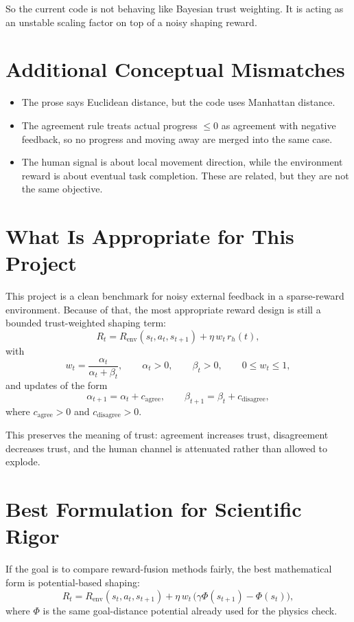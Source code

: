 \documentclass[11pt]{article}
\begin{document}
So the current code is not behaving like Bayesian trust weighting. It is acting as an unstable scaling factor on top of a noisy shaping reward.

\section*{Additional Conceptual Mismatches}

\begin{itemize}
\item The prose says Euclidean distance, but the code uses Manhattan distance.
\item The agreement rule treats actual progress $\leq 0$ as agreement with negative feedback, so no progress and moving away are merged into the same case.
\item The human signal is about local movement direction, while the environment reward is about eventual task completion. These are related, but they are not the same objective.
\end{itemize}

\section*{What Is Appropriate for This Project}

This project is a clean benchmark for noisy external feedback in a sparse-reward environment. Because of that, the most appropriate reward design is still a bounded trust-weighted shaping term:
\[
R_t = R_{\mathrm{env}}(s_t, a_t, s_{t+1}) + \eta \, w_t \, r_h(t),
\]
with
\[
w_t = \frac{\alpha_t}{\alpha_t + \beta_t},
\qquad
\alpha_t > 0,
\qquad
\beta_t > 0,
\qquad
0 \leq w_t \leq 1,
\]
and updates of the form
\[
\alpha_{t+1} = \alpha_t + c_{\mathrm{agree}},
\qquad
\beta_{t+1} = \beta_t + c_{\mathrm{disagree}},
\]
where $c_{\mathrm{agree}} > 0$ and $c_{\mathrm{disagree}} > 0$.

This preserves the meaning of trust: agreement increases trust, disagreement decreases trust, and the human channel is attenuated rather than allowed to explode.

\section*{Best Formulation for Scientific Rigor}

If the goal is to compare reward-fusion methods fairly, the best mathematical form is potential-based shaping:
\[
R_t = R_{\mathrm{env}}(s_t, a_t, s_{t+1}) + \eta \, w_t \, \bigl(\gamma \Phi(s_{t+1}) - \Phi(s_t)\bigr),
\]
where $\Phi$ is the same goal-distance potential already used for the physics check.
\end{document}
